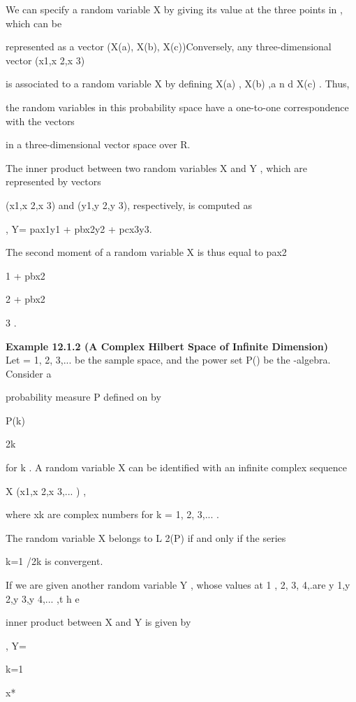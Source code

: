 We can specify a random variable X by giving its value at the three points in \Omega , which can be

represented as a vector (X(a), X(b), X(c))Conversely, any three-dimensional vector (x1,x 2,x 3)

is associated to a random variable X by defining X(a) , X(b) ,a n d X(c) . Thus,

the random variables in this probability space have a one-to-one correspondence with the vectors

in a three-dimensional vector space over R.

The inner product between two random variables X and Y , which are represented by vectors

(x1,x 2,x 3) and (y1,y 2,y 3), respectively, is computed as

\langleX, Y\rangle= pax1y1 + pbx2y2 + pcx3y3.

The second moment of a random variable X is thus equal to pax2

1 + pbx2

2 + pbx2

3 .

\textbf{Example 12.1.2 (A Complex Hilbert Space of Infinite Dimension)} \\

Let \Omega ={ 1, 2, 3,... } be the sample space, and the power set P(\Omega) be the \sigma-algebra. Consider a

probability measure P defined on \Omega by

P({k}) 

2k

for k . A random variable X can be identified with an infinite complex sequence

X (x1,x 2,x 3,... ) ,

where xk are complex numbers for k = 1, 2, 3,... .

The random variable X belongs to L 2(P) if and only if the series \sum\infty

k=1 \vertxk{}/2k is convergent.

If we are given another random variable Y , whose values at 1 , 2, 3, 4,.are y 1,y 2,y 3,y 4,... ,t h e

inner product between X and Y is given by

\langleX, Y\rangle=

\infty\sum

k=1

x*

